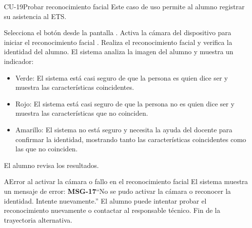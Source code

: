 
\begin{UseCase}{CU-19}{Probar reconocimiento facial}{
		Este caso de uso permite al alumno registrar su asistencia al ETS.
	}
\end{UseCase}
\begin{UCtrayectoria}
	\UCpaso[\UCactor] Selecciona el botón  desde la pantalla .
	\UCpaso Activa la cámara del dispositivo para iniciar el reconocimiento facial . 
	\UCpaso Realiza el reconocimiento facial y verifica la identidad del alumno.
	\UCpaso El sistema analiza la imagen del alumno y muestra un indicador:
	\begin{itemize}
		\item Verde: El sistema está casi seguro de que la persona es quien dice ser y muestra las características coincidentes.
		\item Rojo: El sistema está casi seguro de que la persona no es quien dice ser y muestra las características que no coinciden. 
		\item Amarillo: El sistema no está seguro y necesita la ayuda del docente para confirmar la identidad, mostrando tanto las características coincidentes como las que no coinciden. 
	\end{itemize}
	\UCpaso[\UCactor] El alumno revisa los resultados.
\end{UCtrayectoria}
\begin{UCtrayectoriaA}{A}{Error al activar la cámara o fallo en el reconocimiento facial}
	\UCpaso El sistema muestra un mensaje de error: {\bf MSG-17}{``No se pudo activar la cámara o reconocer la identidad. Intente nuevamente.''}
	\UCpaso[\UCactor] El alumno puede intentar probar el reconocimiento nuevamente o contactar al responsable técnico.
	\UCpaso Fin de la trayectoria alternativa.
\end{UCtrayectoriaA}

